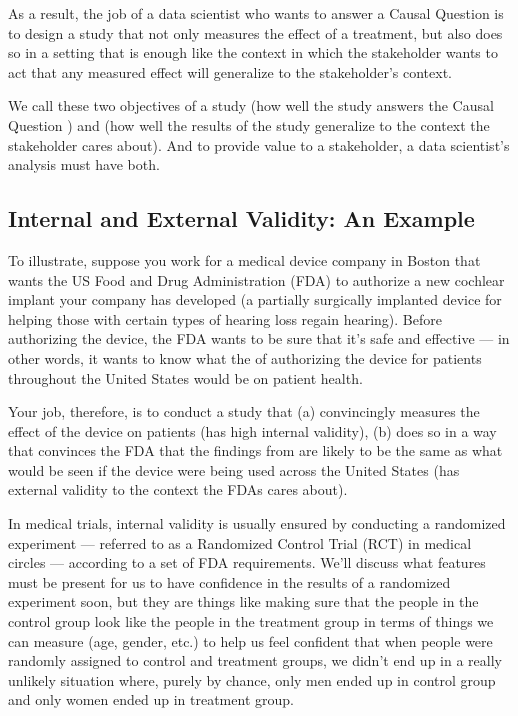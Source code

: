 \documentclass[letterpaper,10pt,english]{jupyterBook}
\begin{document}
\sphinxAtStartPar
As a result, the job of a data scientist who wants to answer a Causal Question is to design a study that not only measures the effect of a treatment, but also does so in a setting that is enough like the context in which the stakeholder wants to act that any measured effect will generalize to the stakeholder’s context.

\sphinxAtStartPar
We call these two objectives of a study  (how well the study answers the Causal Question ) and  (how well the results of the study generalize to the context the stakeholder cares about). And to provide value to a stakeholder, a data scientist’s analysis must have both.


\subsection{Internal and External Validity: An Example}
\label{\detokenize{30_questions/35_using_causal_questions:internal-and-external-validity-an-example}}
\sphinxAtStartPar
To illustrate, suppose you work for a medical device company in Boston that wants the US Food and Drug Administration (FDA) to authorize a new cochlear implant your company has developed (a partially surgically implanted device for helping those with certain types of hearing loss regain hearing). Before authorizing the device, the FDA wants to be sure that it’s safe and effective — in other words, it wants to know what the  of authorizing the device for patients throughout the United States would be on patient health.

\sphinxAtStartPar
Your job, therefore, is to conduct a study that (a) convincingly measures the effect of the device on patients (has high internal validity),  (b) does so in a way that convinces the FDA that the findings from  are likely to be the same as what would be seen if the device were being used across the United States (has external validity to the context the FDAs cares about).

\sphinxAtStartPar
In medical trials, internal validity is usually ensured by conducting a randomized experiment — referred to as a Randomized Control Trial (RCT) in medical circles — according to a set of FDA requirements. We’ll discuss what features must be present for us to have confidence in the results of a randomized experiment soon, but they are things like making sure that the people in the control group look like the people in the treatment group in terms of things we can measure (age, gender, etc.) to help us feel confident that when people were randomly assigned to control and treatment groups, we didn’t end up in a really unlikely situation where, purely by chance, only men ended up in control group and only women ended up in treatment group.
\end{document}
